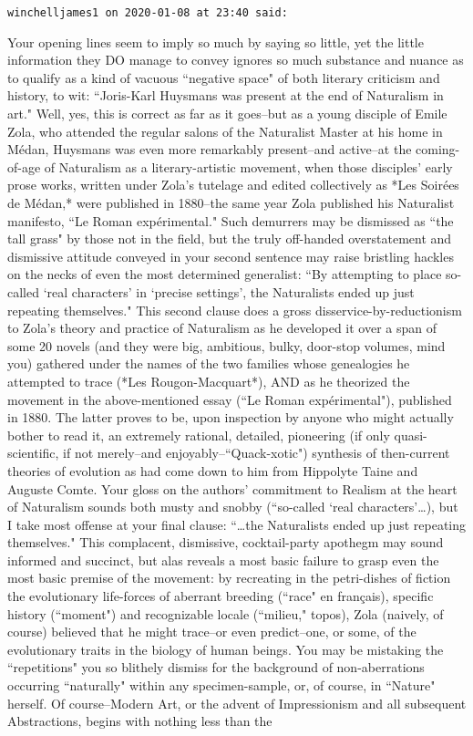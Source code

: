 \begin{footnotesize}\begin{sffamily}



\texttt{winchelljames1 on 2020-01-08 at 23:40 said: }

Your opening lines seem to imply so much by saying so little, yet the little information they DO manage to convey ignores so much substance and nuance as to qualify as a kind of vacuous ``negative space" of both literary criticism and history, to wit: ``Joris-Karl Huysmans was present at the end of Naturalism in art." Well, yes, this is correct as far as it goes–but as a young disciple of Emile Zola, who attended the regular salons of the Naturalist Master at his home in Médan, Huysmans was even more remarkably present–and active–at the coming-of-age of Naturalism as a literary-artistic movement, when those disciples' early prose works, written under Zola's tutelage and edited collectively as *Les Soirées de Médan,* were published in 1880–the same year Zola published his Naturalist manifesto, ``Le Roman expérimental." Such demurrers may be dismissed as ``the tall grass" by those not in the field, but the truly off-handed overstatement and dismissive attitude conveyed in your second sentence may raise bristling hackles on the necks of even the most determined generalist: ``By attempting to place so-called `real characters' in `precise settings', the Naturalists ended up just repeating themselves." This second clause does a gross disservice-by-reductionism to Zola's theory and practice of Naturalism as he developed it over a span of some 20 novels (and they were big, ambitious, bulky, door-stop volumes, mind you) gathered under the names of the two families whose genealogies he attempted to trace (*Les Rougon-Macquart*), AND as he theorized the movement in the above-mentioned essay (``Le Roman expérimental"), published in 1880. The latter proves to be, upon inspection by anyone who might actually bother to read it, an extremely rational, detailed, pioneering (if only quasi-scientific, if not merely–and enjoyably–``Quack-xotic") synthesis of then-current theories of evolution as had come down to him from Hippolyte Taine and Auguste Comte. Your gloss on the authors' commitment to Realism at the heart of Naturalism sounds both musty and snobby (``so-called `real characters'…), but I take most offense at your final clause: ``…the Naturalists ended up just repeating themselves." This complacent, dismissive, cocktail-party apothegm may sound informed and succinct, but alas reveals a most basic failure to grasp even the most basic premise of the movement: by recreating in the petri-dishes of fiction the evolutionary life-forces of aberrant breeding (``race" en français), specific history (``moment") and recognizable locale (``milieu," topos), Zola (naively, of course) believed that he might trace–or even predict–one, or some, of the evolutionary traits in the biology of human beings. You may be mistaking the ``repetitions" you so blithely dismiss for the background of non-aberrations occurring ``naturally" within any specimen-sample, or, of course, in ``Nature" herself. Of course–Modern Art, or the advent of Impressionism and all subsequent Abstractions, begins with nothing less than the 
\end{sffamily}
\end{footnotesize}
